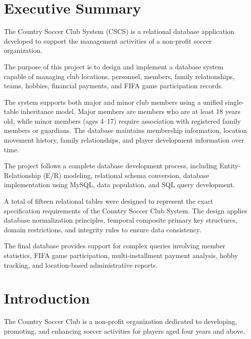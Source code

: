 \documentclass[11pt,a4paper]{article}
\begin{document}
\section{Executive Summary}


The Country Soccer Club System (CSCS) is a relational database
application developed to support the management activities of a
non-profit soccer organization.


The purpose of this project is to design and implement a database system
capable of managing club locations, personnel, members, family
relationships, teams, hobbies, financial payments, and FIFA game
participation records.


The system supports both major and minor club members using a unified
single-table inheritance model. Major members are members who are at
least 18 years old, while minor members (ages 4--17) require association with
registered family members or guardians. The database maintains membership
information, location movement history, family relationships, and player
development information over time.


The project follows a complete database development process, including
Entity-Relationship (E/R) modeling, relational schema conversion,
database implementation using MySQL, data population, and SQL query
development.


A total of fifteen relational tables were designed to represent the
exact specification requirements of the Country Soccer Club System. The design
applies database normalization principles, temporal composite primary key
structures, domain restrictions, and integrity rules to ensure data consistency.


The final database provides support for complex queries involving member
statistics, FIFA game participation, multi-installment payment analysis,
hobby tracking, and location-based administrative reports.



\section{Introduction}


The Country Soccer Club is a non-profit organization dedicated to
developing, promoting, and enhancing soccer activities for players aged
four years and above.
\end{document}
